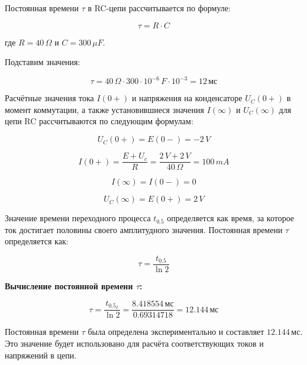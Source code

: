 Постоянная времени $\tau$ в RC-цепи рассчитывается по формуле:

\[
	\tau = R \cdot C
\]

где $R = 40 \, \Omega$ и $C = 300 \, \mu F$.

Подставим значения:

\[
	\tau = 40 \, \Omega \cdot 300 \cdot 10^{-6} \, F \cdot 10^{-3} = 12 \, \text{мс}
\]

Расчётные значения тока $I(0+)$ и напряжения на конденсаторе $U_C(0+)$ в момент коммутации, а также установившиеся значения $I(\infty)$ и $U_C(\infty)$ для цепи RC рассчитываются по следующим формулам:

\[
	U_C(0+) = E(0-) = -2 \, V
\]

\[
	I(0+) = \frac{E + U_c}{R} = \frac{2\, V + 2\, V}{40 \, \Omega} = 100 \, mA
\]

\[
	I(\infty) = I(0-) = 0
\]

\[
	U_C(\infty) = E(0+) = 2 \, V
\]

Значение времени переходного процесса \( t_{0.5} \) определяется как время, за которое ток достигает половины своего амплитудного значения. Постоянная времени \( \tau \) определяется как:

\[
	\tau = \frac{t_{0.5}}{\ln 2}
\]

\textbf{Вычисление постоянной времени \( \tau \):}

\[
	\tau = \frac{t_{0.5_I}}{\ln 2} = \frac{8.418554 \, \text{мс}}{0.69314718} = 12.144 \, \text{мс}
\]


Постоянная времени \( \tau \) была определена экспериментально и составляет
\( 12.144 \, \text{мс} \). Это значение будет использовано для расчёта соответствующих токов и напряжений в цепи.
